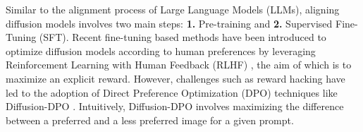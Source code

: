 
Similar to the alignment process of Large Language Models (LLMs), aligning diffusion models involves two main steps: \textbf{1.} Pre-training and \textbf{2.} Supervised Fine-Tuning (SFT). Recent fine-tuning based methods have been introduced to optimize diffusion models according to human preferences by leveraging Reinforcement Learning with Human Feedback (RLHF) \citep{ouyang2022training}, the aim of which is to maximize an explicit reward. However, challenges such as reward hacking have led to the adoption of Direct Preference Optimization (DPO) \citep{rafailov2024direct} techniques like Diffusion-DPO \citep{wallace2024diffusion}.  Intuitively, Diffusion-DPO involves maximizing the difference between a preferred and a less preferred image for a given prompt.




